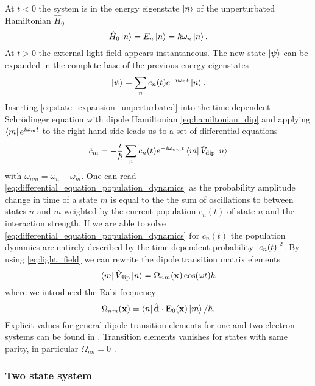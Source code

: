 At $t<0$ the system is in the energy eigenstate $\ket{n}$ of the
unperturbated Hamiltonian $\hat{H}_0$
\begin{equation}
  \hat{H}_0\ket{n}
  =E_n\ket{n}
  =\hbar\omega_n\ket{n}
  \label{eq:eigenvalue_energy_unperturbated}.
\end{equation}
At $t>0$ the external light field appears instantaneous. The new state
$\ket{\psi}$ can be expanded in the complete base of the previous energy
eigenstates
\begin{equation}
  \ket{\psi}
  =
  \sum_n{c_n(t)}{e^{-i{\omega_n}t}}\ket{n}
  \label{eq:state_expansion_unperturbated}.
\end{equation}
Inserting \cref{eq:state_expansion_unperturbated} into the time-dependent
Schrödinger equation with dipole Hamiltonian \cref{eq:hamiltonian_dip} and
applying $\bra{m}{e^{i{\omega_m}t}}$ to the right hand side leads us to a set
of differential equations
\begin{equation}
  \dot{c}_m
  =
  -\frac{i}{\hbar}\sum_n{c_n(t)}{e^{-i\omega_{nm}t}}
  \bra{m}\hat{V}_\text{dip}\ket{n}
  \label{eq:differential_equation_population_dynamics}
\end{equation}
with $\omega_{nm}=\omega_n-\omega_m$. One can read
\cref{eq:differential_equation_population_dynamics} as the probability
amplitude change in time of a state $m$ is equal to the the sum of
oscillations to between states $n$ and $m$ weighted by the current population
$c_n(t)$ of state $n$ and the interaction strength. If we are able to solve
\cref{eq:differential_equation_population_dynamics} for $c_n(t)$ the
population dynamics are entirely described by the time-dependent probability
$\abs{c_n(t)}^2$. By using \cref{eq:light_field} we can rewrite the dipole
transition matrix elements
\begin{equation}
  \bra{m}\hat{V}_\text{dip}\ket{n}
  =\Omega_{nm}(\vb{x})\cos(\omega t)\hbar
  \label{eq:elements_dipole_transition_matrix}
\end{equation}
where we introduced the Rabi frequency
\begin{equation}
  \Omega_{nm}(\vb{x})
  =\bra{n}\hat{\vb{d}}\cdot\vb{E}_0(\vb{x})\ket{m}/\hbar
  \label{eq:rabi_frequency}.
\end{equation}
Explicit values for general dipole transition elements for one and two
electron systems can be found in \cite{Bethe1957}. Transition elements
vanishes for states with same parity, in particular $\Omega_{nn}=0$
\cite{Bartelmann2018}.

\subsubsection{Two state system}

